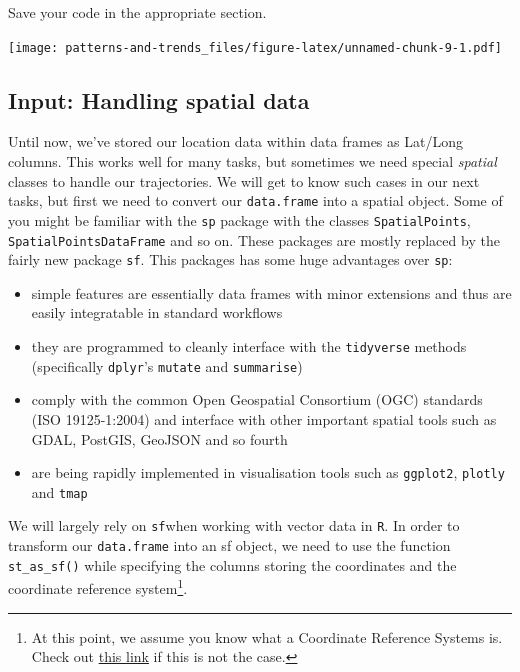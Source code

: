 \documentclass[]{book}
\providecommand{\tightlist}{%
  \setlength{\itemsep}{0pt}\setlength{\parskip}{0pt}}
\let\rmarkdownfootnote\footnote%
\def\footnote{\protect\rmarkdownfootnote}
\begin{document}
Save your code in the appropriate section.

\texttt{[image: patterns-and-trends\_files/figure-latex/unnamed-chunk-9-1.pdf]}

\hypertarget{input-handling-spatial-data}{%
\subsection{Input: Handling spatial data}\label{input-handling-spatial-data}}

Until now, we've stored our location data within data frames as Lat/Long columns. This works well for many tasks, but sometimes we need special \emph{spatial} classes to handle our trajectories. We will get to know such cases in our next tasks, but first we need to convert our \texttt{data.frame} into a spatial object.
Some of you might be familiar with the \texttt{sp} package with the classes \texttt{SpatialPoints}, \texttt{SpatialPointsDataFrame} and so on. These packages are mostly replaced by the fairly new package \texttt{sf}. This packages has some huge advantages over \texttt{sp}:

\begin{itemize}
\tightlist
\item
  simple features are essentially data frames with minor extensions and thus are easily integratable in standard workflows
\item
  they are programmed to cleanly interface with the \texttt{tidyverse} methods (specifically \texttt{dplyr}'s \texttt{mutate} and \texttt{summarise})
\item
  comply with the common Open Geospatial Consortium (OGC) standards (ISO 19125-1:2004) and interface with other important spatial tools such as GDAL, PostGIS, GeoJSON and so fourth
\item
  are being rapidly implemented in visualisation tools such as \texttt{ggplot2}, \texttt{plotly} and \texttt{tmap}
\end{itemize}

We will largely rely on \texttt{sf}when working with vector data in \texttt{R}. In order to transform our \texttt{data.frame} into an sf object, we need to use the function \texttt{st\_as\_sf()} while specifying the columns storing the coordinates and the coordinate reference system\footnote{At this point, we assume you know what a Coordinate Reference Systems is. Check out \href{https://earthdatascience.org/courses/earth-analytics/spatial-data-r/intro-to-coordinate-reference-systems/}{this link} if this is not the case.}.
\end{document}
